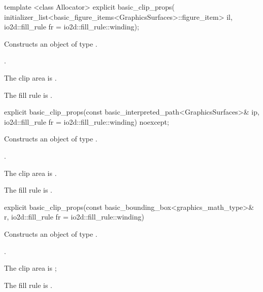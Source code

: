 %
\begin{itemdecl}
template <class Allocator>
explicit basic_clip_props(
  initializer_list<basic_figure_items<GraphicsSurfaces>::figure_item> il,
  io2d::fill_rule fr = io2d::fill_rule::winding);
\end{itemdecl}
\begin{itemdescr}
\pnum
\effects
Constructs an object of type .

\pnum
\postconditions
{}.

\remarks
\pnum
The clip area is .

\pnum
The fill rule is .
\end{itemdescr}

%
\begin{itemdecl}
explicit basic_clip_props(const basic_interpreted_path<GraphicsSurfaces>& ip,
  io2d::fill_rule fr = io2d::fill_rule::winding) noexcept;
\end{itemdecl}
\begin{itemdescr}
\pnum
\effects
Constructs an object of type .

\pnum
\postconditions
{}.

\remarks
\pnum
The clip area is .

\pnum
The fill rule is .
\end{itemdescr}

%
\begin{itemdecl}
explicit basic_clip_props(const basic_bounding_box<graphics_math_type>& r,
  io2d::fill_rule fr = io2d::fill_rule::winding)
\end{itemdecl}
\begin{itemdescr}
\pnum
\effects
Constructs an object of type .

\pnum
\postconditions
{}.

\remarks
\pnum
The clip area is ;

\pnum
The fill rule is .
\end{itemdescr}

